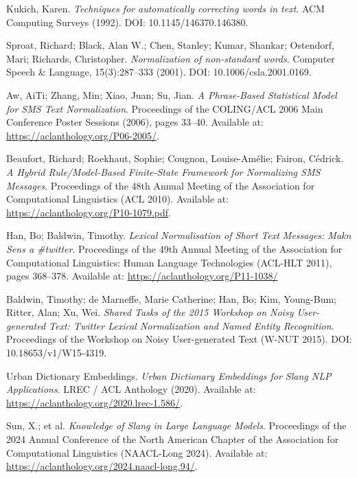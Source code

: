 \documentclass[12pt]{article}
\begin{document}
\begin{thebibliography}{9}
Kukich, Karen.
\textit{Techniques for automatically correcting words in text}.
ACM Computing Surveys (1992).
DOI: 10.1145/146370.146380.

Sproat, Richard; Black, Alan W.; Chen, Stanley; Kumar, Shankar; Ostendorf, Mari; Richards, Christopher.
\textit{Normalization of non-standard words}.
Computer Speech \& Language, 15(3):287–333 (2001).
DOI: 10.1006/csla.2001.0169.

Aw, AiTi; Zhang, Min; Xiao, Juan; Su, Jian.
\textit{A Phrase-Based Statistical Model for SMS Text Normalization}.
Proceedings of the COLING/ACL 2006 Main Conference Poster Sessions (2006), pages 33–40.
Available at: \url{https://aclanthology.org/P06-2005/}.

Beaufort, Richard; Roekhaut, Sophie; Cougnon, Louise-Amélie; Fairon, Cédrick.
\textit{A Hybrid Rule/Model-Based Finite-State Framework for Normalizing SMS Messages}.
Proceedings of the 48th Annual Meeting of the Association for Computational Linguistics (ACL 2010).
Available at: \url{https://aclanthology.org/P10-1079.pdf}.

Han, Bo; Baldwin, Timothy.
\textit{Lexical Normalisation of Short Text Messages: Makn Sens a \#twitter}.
Proceedings of the 49th Annual Meeting of the Association for Computational Linguistics: Human Language Technologies (ACL-HLT 2011), pages 368–378.
Available at: \url{https://aclanthology.org/P11-1038/}

Baldwin, Timothy; de Marneffe, Marie Catherine; Han, Bo; Kim, Young-Bum; Ritter, Alan; Xu, Wei.
\textit{Shared Tasks of the 2015 Workshop on Noisy User-generated Text: Twitter Lexical Normalization and Named Entity Recognition}.
Proceedings of the Workshop on Noisy User-generated Text (W-NUT 2015).
DOI: 10.18653/v1/W15-4319.

Urban Dictionary Embeddings.
\textit{Urban Dictionary Embeddings for Slang NLP Applications}.
LREC / ACL Anthology (2020).
Available at: \url{https://aclanthology.org/2020.lrec-1.586/}.

Sun, X.; et al.
\textit{Knowledge of Slang in Large Language Models}.
Proceedings of the 2024 Annual Conference of the North American Chapter of the Association for Computational Linguistics (NAACL-Long 2024).
Available at: \url{https://aclanthology.org/2024.naacl-long.94/}.




\end{thebibliography}
\end{document}
